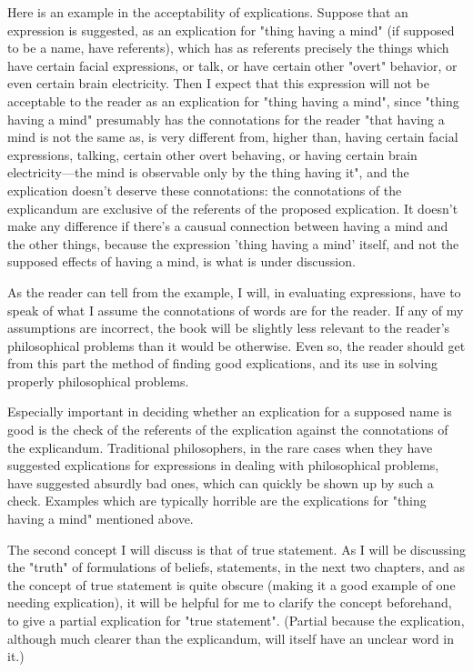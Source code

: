\documentclass[10pt,twoside]{memoir}
\begin{document}
\begin{enumerate}
Here is an example in the acceptability of explications. Suppose that an 
expression is suggested, as an explication for "thing having a mind" (if 
supposed to be a name, have referents), which has as referents precisely the 
things which have certain facial expressions, or talk, or have certain other 
"overt" behavior, or even certain brain electricity. Then I expect that this 
expression will not be acceptable to the reader as an explication for "thing 
having a mind", since "thing having a mind" presumably has the connotations 
for the reader "that having a mind is not the same as, is very different from, 
higher than, having certain facial expressions, talking, certain other overt 
behaving, or having certain brain electricity---the mind is observable only by 
the thing having it", and the explication doesn't deserve these connotations: 
the connotations of the explicandum are exclusive of the referents of the 
proposed explication. It doesn't make any difference if there's a causual 
connection between having a mind and the other things, because the 
expression 'thing having a mind' itself, and not the supposed effects of 
having a mind, is what is under discussion. 

As the reader can tell from the example, I will, in evaluating 
expressions, have to speak of what I assume the connotations of words are 
for the reader. If any of my assumptions are incorrect, the book will be 
slightly less relevant to the reader's philosophical problems than it would be 
otherwise. Even so, the reader should get from this part the method of 
finding good explications, and its use in solving properly philosophical 
problems. 

Especially important in deciding whether an explication for a supposed 
name is good is the check of the referents of the explication against the 
connotations of the explicandum. Traditional philosophers, in the rare cases 
when they have suggested explications for expressions in dealing with 
philosophical problems, have suggested absurdly bad ones, which can quickly 
be shown up by such a check. Examples which are typically horrible are the 
explications for "thing having a mind" mentioned above. 

The second concept I will discuss is that of true statement. As I will be 
discussing the "truth" of formulations of beliefs, statements, in the next two 
chapters, and as the concept of true statement is quite obscure (making it a 
good example of one needing explication), it will be helpful for me to clarify 
the concept beforehand, to give a partial explication for "true statement". 
(Partial because the explication, although much clearer than the 
explicandum, will itself have an unclear word in it.) 


\end{enumerate}
\end{document}
